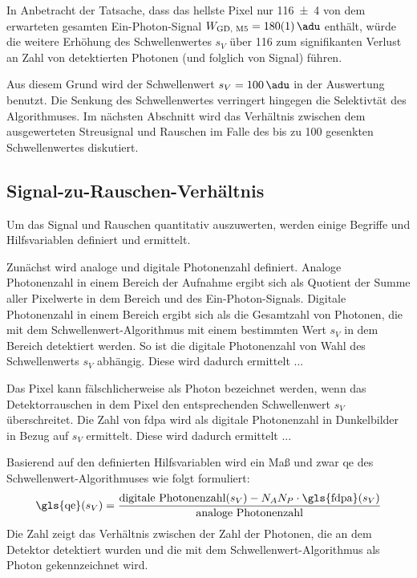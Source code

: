 \noindent
In Anbetracht der Tatsache, dass das hellste Pixel nur \SI{116(4)}{\adu} von dem erwarteten gesamten Ein-Photon-Signal $W_\text{GD, M5} = \SI{180(1)}{\adu}$ enthält, würde die weitere Erhöhung des Schwellenwertes $s_V$ über \SI{116}{\adu} zum signifikanten Verlust an Zahl von detektierten Photonen (und folglich von Signal) führen.

\noindent
Aus diesem Grund wird der Schwellenwert $s_V = \SI{100}{\adu}$ in der Auswertung benutzt. Die Senkung des Schwellenwertes verringert hingegen die Selektivtät des Algorithmuses. Im nächsten Abschnitt wird das Verhältnis zwischen dem ausgewerteten Streusignal und Rauschen im Falle des bis zu \SI{100}{\adu} gesenkten Schwellenwertes diskutiert.

\subsection{Signal-zu-Rauschen-Verhältnis}
Um das Signal und Rauschen quantitativ auszuwerten, werden einige Begriffe und Hilfsvariablen definiert und ermittelt. 

\noindent
Zunächst wird analoge und digitale Photonenzahl definiert. Analoge Photonenzahl in einem Bereich der Aufnahme ergibt sich als Quotient der Summe aller Pixelwerte in dem Bereich und des Ein-Photon-Signals. Digitale Photonenzahl in einem Bereich ergibt sich als die Gesamtzahl von Photonen, die mit dem Schwellenwert-Algorithmus mit einem bestimmten Wert $s_V$ in dem Bereich detektiert werden. So ist die digitale Photonenzahl von Wahl des Schwellenwerts $s_V$ abhängig. Diese wird dadurch ermittelt ...

\noindent
Das Pixel kann fälschlicherweise als Photon bezeichnet werden, wenn das Detektorrauschen in dem Pixel den entsprechenden Schwellenwert $s_V$ überschreitet. Die Zahl von \gls{fdpa} wird als digitale Photonenzahl in Dunkelbilder in Bezug auf $s_V$ ermittelt. Diese wird dadurch ermittelt ...

\noindent
Basierend auf den definierten Hilfsvariablen wird ein Maß und zwar \gls{qe} des Schwellenwert-Algorithmuses wie folgt formuliert:
\begin{equation}
    \text{\gls{qe}}(s_V) = \frac{\text{digitale Photonenzahl}(s_V) - N_A N_P \cdot \text{\gls{fdpa}}(s_V)}{\text{analoge Photonenzahl}}
\end{equation}
Die Zahl zeigt das Verhältnis zwischen der Zahl der Photonen, die an dem Detektor detektiert wurden und die mit dem Schwellenwert-Algorithmus als Photon gekennzeichnet wird.

